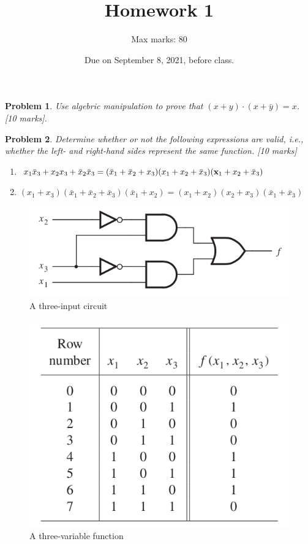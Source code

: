 \documentclass[twocolumn]{article}
\title{Homework 1}
\author{Max marks: 80}
\date{Due on September 8, 2021, before class.}
\newtheorem{prob}{Problem}
\newcommand{\bx}{\bar{x}}
\begin{document}
\maketitle

\begin{prob}
Use algebric manipulation to prove that $(x+y)\cdot(x+\bar{y}) = x$. \cite[Prob 2.2]{brown2013fundamentals} [10 marks].
\end{prob}

\begin{prob}
Determine whether or not the following expressions are valid, i.e., whether the left- and
right-hand sides represent the same function.
\cite[Prob 2.7]{brown2013fundamentals}[10 marks]
\begin{enumerate}
    \item $x_1 \bx_3 + x_2 x_3 + \bx_2 \bx_3 = (\bx_1 + \bx_2 + x_3)(x_1 + x_2 + \bx_3)(\bfx_1 + x_2 + \bx_3)$
    \item $(x_1 + x_3)(\bx_1 + \bx_2 + \bx_3)(\bx_1 + x_2) = (x_1 + x_2)(x_2 + x_3)(\bx_1 + \bx_3)$
\end{enumerate}
\end{prob}

\begin{figure}
\centering
\includegraphics[width=\linewidth]{fig-2.24a.png}
\caption{A three-input circuit}
\label{fig:fig-2.24a}
\end{figure}

\begin{figure}
    \centering
    \includegraphics[width=\linewidth]{fig-2.23.png}
    \caption{A three-variable function}
    \label{fig:fig-2.23}
\end{figure}
\end{document}
